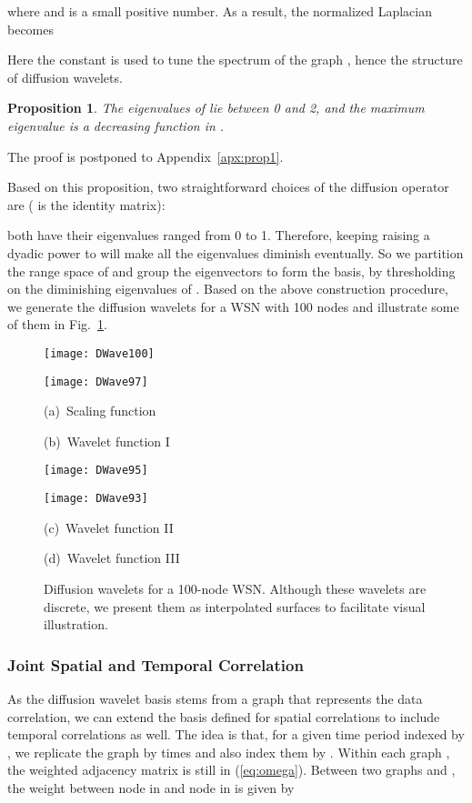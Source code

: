\documentclass[conference]{IEEEtran}
\newtheorem{prop}{Proposition}
\begin{document}
where  and  is a small positive number. As a result, the normalized Laplacian becomes

Here the constant  is used to tune the spectrum of the graph , hence the structure of diffusion wavelets.
\begin{prop} \label{prop1}
The eigenvalues of  lie between 0 and 2, and the maximum eigenvalue  is a decreasing function in .
\end{prop}
The proof is postponed to Appendix~\ref{apx:prop1}.

      Based on this proposition, two straightforward choices of the diffusion operator  are ( is the identity matrix):

both have their eigenvalues ranged from 0 to 1. Therefore, keeping raising a dyadic power to  will make all the eigenvalues diminish eventually. So we partition the range space of  and group the eigenvectors to form the basis, by thresholding on the diminishing eigenvalues of . Based on the above construction procedure, we generate the diffusion wavelets for a WSN with 100 nodes and illustrate some of them in Fig.~\ref{fig:dwave}.
      \begin{figure}[htb]
\parbox{\columnwidth}{\parbox{.49\columnwidth}{\center\texttt{[image: DWave100]}}
                              \parbox{.49\columnwidth}{\center\texttt{[image: DWave97]}}}
        \parbox{\columnwidth}{\parbox{.49\columnwidth}{\center\scriptsize(a)~Scaling function}
                              \parbox{.49\columnwidth}{\center\scriptsize(b)~Wavelet function I}}
        \parbox{\columnwidth}{\parbox{.49\columnwidth}{\center\texttt{[image: DWave95]}}
                              \parbox{.49\columnwidth}{\center\texttt{[image: DWave93]}}}
        \parbox{\columnwidth}{\parbox{.49\columnwidth}{\center\scriptsize(c)~Wavelet function II}
                              \parbox{.49\columnwidth}{\center\scriptsize(d)~Wavelet function III}}
        \caption{Diffusion wavelets for a 100-node WSN. Although these wavelets are discrete, we present them as interpolated surfaces to facilitate visual illustration.} \label{fig:dwave}
\end{figure}

    \subsubsection{Joint Spatial and Temporal Correlation} \label{sec:jstc}
As the diffusion wavelet basis stems from a graph that represents the data correlation, we can extend the basis defined for spatial correlations to include temporal correlations as well. The idea is that, for a given time period indexed by , we replicate the graph  by  times and also index them by . Within each graph , the weighted adjacency matrix is still  in (\ref{eq:omega}). Between two graphs  and , the weight between node  in  and node  in  is given by
      
\end{document}
